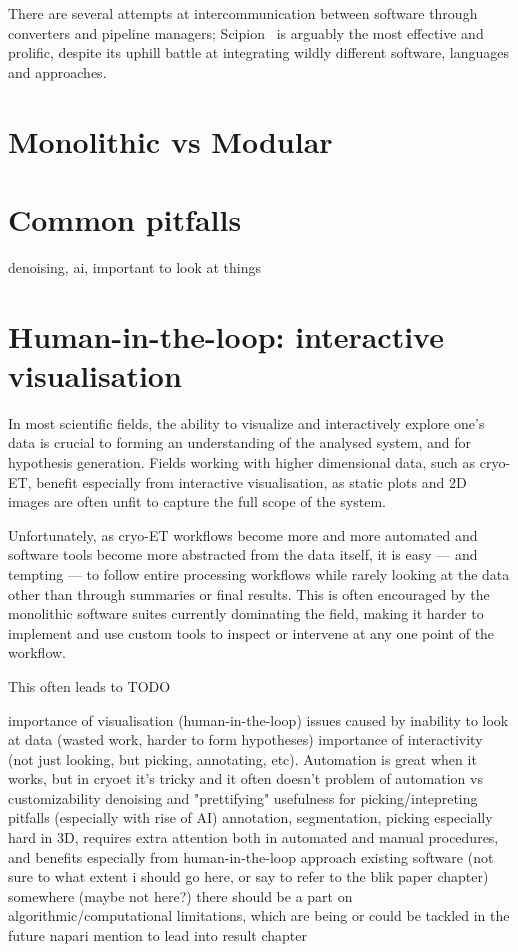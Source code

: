 There are several attempts at intercommunication between software through converters and pipeline managers; Scipion~\cite{delarosa-trevinScipionSoftwareFramework2016} is arguably the most effective and prolific, despite its uphill battle at integrating wildly different software, languages and approaches.

\section{Monolithic vs Modular}



\section{Common pitfalls}

denoising, ai, important to look at things

\section{Human-in-the-loop: interactive visualisation}

In most scientific fields, the ability to visualize and interactively explore one's data is crucial to forming an understanding of the analysed system, and for hypothesis generation.
Fields working with higher dimensional data, such as cryo-ET, benefit especially from interactive visualisation, as static plots and 2D images are often unfit to capture the full scope of the system.

Unfortunately, as cryo-ET workflows become more and more automated and software tools become more abstracted from the data itself, it is easy --- and tempting --- to follow entire processing workflows while rarely looking at the data other than through summaries or final results.
This is often encouraged by the monolithic software suites currently dominating the field, making it harder to implement and use custom tools to inspect or intervene at any one point of the workflow.

This often leads to TODO


\begin{outline}
\1 importance of visualisation (human-in-the-loop)
    \2 issues caused by inability to look at data (wasted work, harder to form hypotheses)
    \2 importance of interactivity (not just looking, but picking, annotating, etc). Automation is great when it works, but in cryoet it's tricky and it often doesn't
        \3 problem of automation vs customizability
\1 denoising and "prettifying"
    \2 usefulness for picking/intepreting
    \2 pitfalls (especially with rise of AI)
\1 annotation, segmentation, picking
    \2 especially hard in 3D, requires extra attention both in automated and manual procedures, and benefits especially from human-in-the-loop approach
    \2 existing software (not sure to what extent i should go here, or say to refer to the blik paper chapter)
\1 somewhere (maybe not here?) there should be a part on algorithmic/computational limitations, which are being or could be tackled in the future
\1 napari mention to lead into result chapter
\end{outline}
